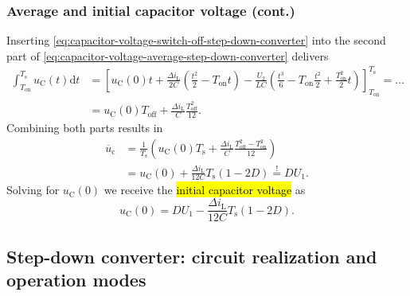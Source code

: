 \begin{frame}
    \frametitle{Average and initial capacitor voltage (cont.)}
     Inserting \eqref{eq:capacitor-voltage-switch-off-step-down-converter} into the second part of \eqref{eq:capacitor-voltage-average-step-down-converter} delivers
    \begin{equation}
        \begin{split}
            \int_{T_\mathrm{on}}^{T_\mathrm{s}} u_\mathrm{C}(t) \mathrm{d}t &= \left[u_\mathrm{C}(0)t +  \frac{\Delta i_\mathrm{L}}{2C}(\frac{t^2}{2} - T_\mathrm{on}t) - \frac{U_2}{LC}(\frac{t^3}{6} - T_\mathrm{on}\frac{t^2}{2} + \frac{T_\mathrm{on}^2}{2}t)  \right]_{T_\mathrm{on}}^{T_\mathrm{s}} =\ldots \\ &= u_\mathrm{C}(0) T_\mathrm{off} + \frac{\Delta i_\mathrm{L}}{C}\frac{T_\mathrm{off}^2}{12}.
        \end{split}
    \end{equation}
    Combining both parts results in
    \begin{equation}
    \begin{split}
        \overline{u}_\mathrm{c} &= \frac{1}{T_\mathrm{s}}\left(u_\mathrm{C}(0)T_\mathrm{s} + \frac{\Delta i_\mathrm{L}}{C}\frac{T_\mathrm{off}^2-T_\mathrm{on}^2}{12} \right)\\
                                & = u_\mathrm{C}(0) + \frac{\Delta i_\mathrm{L}}{12C}T_\mathrm{s}(1-2D) \stackrel{!}{=} D U_1.
        \end{split}
    \end{equation}
    Solving for $u_\mathrm{C}(0)$ we receive the \hl{initial capacitor voltage} as
    \begin{equation}
        u_\mathrm{C}(0) = D U_1 - \frac{\Delta i_\mathrm{L}}{12C}T_\mathrm{s}(1-2D).
    \end{equation}
\end{frame}

\subsection{Step-down converter: circuit realization and operation modes}

